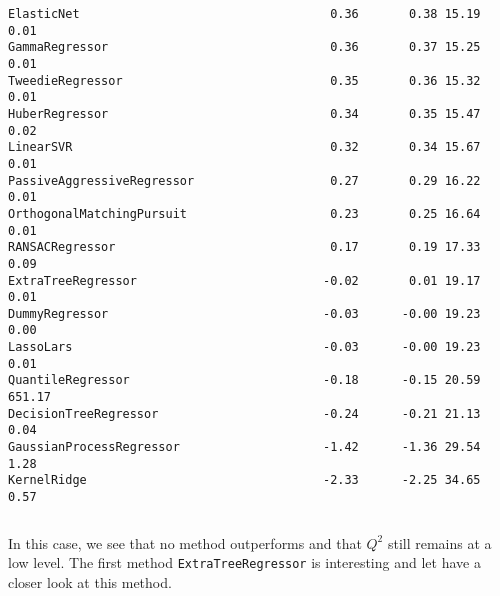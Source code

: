 \documentclass[11pt]{article}
\begin{document}
\begin{Verbatim}[commandchars=\\\{\}]
ElasticNet                                   0.36       0.38 15.19        0.01
GammaRegressor                               0.36       0.37 15.25        0.01
TweedieRegressor                             0.35       0.36 15.32        0.01
HuberRegressor                               0.34       0.35 15.47        0.02
LinearSVR                                    0.32       0.34 15.67        0.01
PassiveAggressiveRegressor                   0.27       0.29 16.22        0.01
OrthogonalMatchingPursuit                    0.23       0.25 16.64        0.01
RANSACRegressor                              0.17       0.19 17.33        0.09
ExtraTreeRegressor                          -0.02       0.01 19.17        0.01
DummyRegressor                              -0.03      -0.00 19.23        0.00
LassoLars                                   -0.03      -0.00 19.23        0.01
QuantileRegressor                           -0.18      -0.15 20.59      651.17
DecisionTreeRegressor                       -0.24      -0.21 21.13        0.04
GaussianProcessRegressor                    -1.42      -1.36 29.54        1.28
KernelRidge                                 -2.33      -2.25 34.65        0.57
    \end{Verbatim}

    \begin{Verbatim}[commandchars=\\\{\}]

    \end{Verbatim}

    In this case, we see that no method outperforms and that \(Q^2\) still
remains at a low level. The first method \texttt{ExtraTreeRegressor} is
interesting and let have a closer look at this method.
\end{document}
